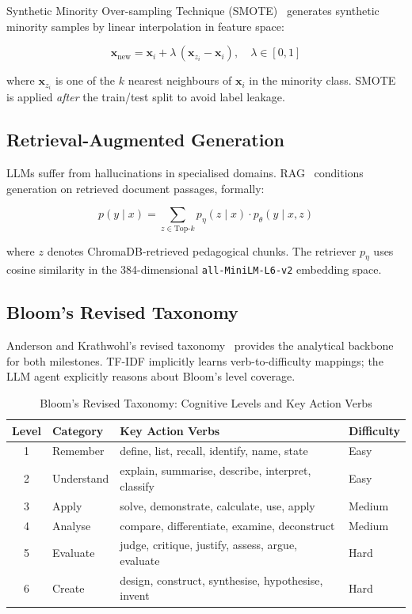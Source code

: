 \documentclass[12pt,a4paper]{article}
\begin{document}
Synthetic Minority Over-sampling Technique (SMOTE)~\cite{smote} generates synthetic minority
samples by linear interpolation in feature space:

\begin{equation}
  \mathbf{x}_{\text{new}} = \mathbf{x}_i + \lambda\,(\mathbf{x}_{z_i} - \mathbf{x}_i),
  \quad \lambda \in [0,1]
  \label{eq:smote}
\end{equation}

where $\mathbf{x}_{z_i}$ is one of the $k$ nearest neighbours of $\mathbf{x}_i$ in the
minority class. SMOTE is applied \emph{after} the train/test split to avoid label leakage.

\subsection{Retrieval-Augmented Generation}

LLMs suffer from hallucinations in specialised domains. RAG~\cite{lewis2020rag} conditions
generation on retrieved document passages, formally:

\begin{equation}
  p(y \mid x) = \sum_{z \in \text{Top-}k} p_\eta(z \mid x)\cdot p_\theta(y \mid x, z)
  \label{eq:rag}
\end{equation}

where $z$ denotes ChromaDB-retrieved pedagogical chunks. The retriever $p_\eta$ uses cosine similarity
in the 384-dimensional \texttt{all-MiniLM-L6-v2} embedding space.

\subsection{Bloom's Revised Taxonomy}

Anderson and Krathwohl's revised taxonomy~\cite{bloom} provides the analytical backbone
for both milestones. TF-IDF implicitly learns verb-to-difficulty mappings; the LLM agent
explicitly reasons about Bloom's level coverage.

\begin{table}[H]
\centering
\caption{Bloom's Revised Taxonomy: Cognitive Levels and Key Action Verbs}
\label{tab:bloom}
\begin{tabularx}{\textwidth}{clXl}
\toprule
\textbf{Level} & \textbf{Category} & \textbf{Key Action Verbs} & \textbf{Difficulty} \\
\midrule
1 & Remember     & define, list, recall, identify, name, state        & Easy   \\
2 & Understand  & explain, summarise, describe, interpret, classify   & Easy   \\
3 & Apply       & solve, demonstrate, calculate, use, apply           & Medium \\
4 & Analyse     & compare, differentiate, examine, deconstruct        & Medium \\
5 & Evaluate    & judge, critique, justify, assess, argue, evaluate   & Hard   \\
6 & Create      & design, construct, synthesise, hypothesise, invent  & Hard   \\
\bottomrule
\end{tabularx}
\end{table}
\end{document}
